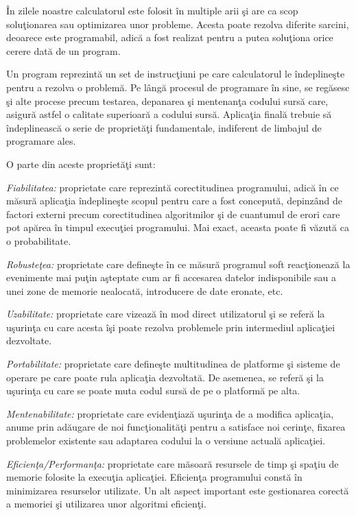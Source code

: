 \^{I}n zilele noastre calculatorul este folosit \^{i}n multiple arii \c{s}i are ca scop solu\c{t}ionarea sau optimizarea unor probleme. Acesta poate rezolva diferite sarcini, deoarece este programabil, adic\u{a} a fost realizat pentru a putea solu\c{t}iona orice cerere dat\u{a} de un program.
\bigskip

Un program reprezint\u{a} un set de instruc\c{t}iuni pe care calculatorul le \^{i}ndepline\c{s}te pentru a rezolva o problem\u{a}. Pe l\^{a}ng\u{a} procesul de programare \^{i}n sine, se reg\u{a}sesc \c{s}i alte procese precum testarea, depanarea \c{s}i mentenan\c{t}a codului surs\u{a} care, asigur\u{a} astfel o calitate superioar\u{a} a codului surs\u{a}. Aplica\c{t}ia final\u{a} trebuie s\u{a} \^{i}ndeplineasc\u{a} o serie de propriet\u{a}\c{t}i fundamentale, indiferent de limbajul de programare ales.
\bigskip

O parte din aceste propriet\u{a}\c{t}i sunt:

\begin{enumerate}
	\utb \textit{Fiabilitatea:} proprietate care reprezint\u{a} corectitudinea programului, adic\u{a} \^{i}n ce m\u{a}sur\u{a} aplica\c{t}ia \^{i}ndepline\c{s}te scopul pentru care a fost conceput\u{a}, depinz\^{a}nd de factori externi precum corectitudinea algoritmilor \c{s}i de cuantumul de erori care pot ap\u{a}rea \^{i}n timpul execu\c{t}iei programului. Mai exact, aceasta poate fi v\u{a}zut\u{a} ca o probabilitate.
	
	\utb \textit{Robuste\c{t}ea:} proprietate care define\c{s}te \^{i}n ce m\u{a}sur\u{a} programul soft reacţioneaz\u{a} la evenimente mai pu\c{t}in a\c{s}teptate cum ar fi accesarea datelor indisponibile sau a unei zone de memorie nealocat\u{a}, introducere de date eronate, etc.
	
	\utb \textit{Uzabilitate:} proprietate care vizeaz\u{a} \^{i}n mod direct utilizatorul \c{s}i se refer\u{a} la u\c{s}urin\c{t}a cu care acesta \^{i}şi poate rezolva problemele prin intermediul aplica\c{t}iei dezvoltate.
	
	\utb \textit{Portabilitate:} proprietate care define\c{s}te multitudinea de platforme \c{s}i sisteme de operare pe care poate rula aplica\c{t}ia dezvoltat\u{a}. De asemenea, se refer\u{a} \c{s}i la uşurin\c{t}a cu care se poate muta codul surs\u{a} de pe o platform\u{a} pe alta.
	
	\utb \textit{Mentenabilitate:} proprietate care eviden\c{t}iaz\u{a} u\c{s}urin\c{t}a de a modifica aplica\c{t}ia, anume prin ad\u{a}ugare de noi funcţionalit\u{a}\c{t}i pentru a satisface noi cerin\c{t}e, fixarea problemelor existente sau adaptarea codului la o versiune actual\u{a} aplica\c{t}iei.
	
	\utb \textit{Eficien\c{t}a/Performan\c{t}a:} proprietate care m\u{a}soar\u{a} resursele de timp \c{s}i spa\c{t}iu de memorie folosite la execu\c{t}ia aplica\c{t}iei. Eficien\c{t}a programului const\u{a} \^{i}n minimizarea resurselor utilizate. Un alt aspect important este gestionarea corect\u{a} a memoriei \c{s}i utilizarea unor algoritmi eficien\c{t}i.
\end{enumerate}

